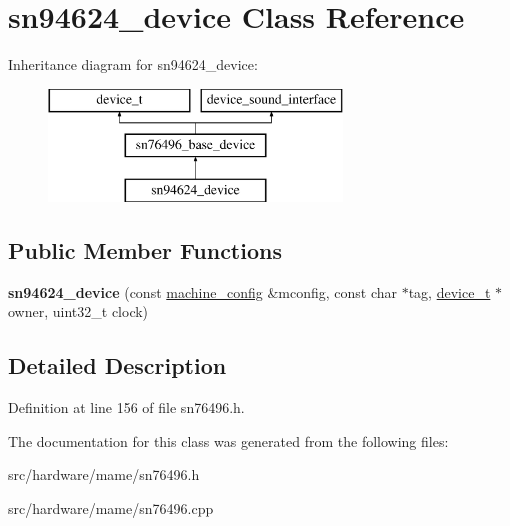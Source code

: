\hypertarget{classsn94624__device}{\section{sn94624\-\_\-device Class Reference}
\label{classsn94624__device}
}
Inheritance diagram for sn94624\-\_\-device\-:\begin{figure}[H]
\begin{center}
\leavevmode
\includegraphics[height=3.000000cm]{classsn94624__device}
\end{center}
\end{figure}
\subsection*{Public Member Functions}
\begin{DoxyCompactItemize}
\item 
\hypertarget{classsn94624__device_a31fc340720a04c0e0400e088239c431a}{{\bfseries sn94624\-\_\-device} (const \hyperlink{structmachine__config}{machine\-\_\-config} \&mconfig, const char $\ast$tag, \hyperlink{classdevice__t}{device\-\_\-t} $\ast$owner, uint32\-\_\-t clock)}\label{classsn94624__device_a31fc340720a04c0e0400e088239c431a}

\end{DoxyCompactItemize}


\subsection{Detailed Description}


Definition at line 156 of file sn76496.\-h.



The documentation for this class was generated from the following files\-:\begin{DoxyCompactItemize}
\item 
src/hardware/mame/sn76496.\-h\item 
src/hardware/mame/sn76496.\-cpp\end{DoxyCompactItemize}
